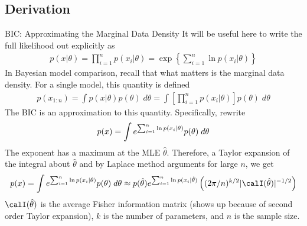 \documentclass[aspectratio=169, handout]{beamer}
\newcommand{\sumin}{\sum^n_{i=1}}
\newcommand{\prodin}{\prod^n_{i=1}}
\begin{document}
\subsection{Derivation}


{\footnotesize
\begin{frame}{BIC: Approximating the Marginal Data Density}
It will be useful here to write the full likelihood out explicitly as
\begin{align*}
  p(x|\theta)
  =
  \prodin p(x_i|\theta)
  =
  \exp\left\{
  \sumin \ln p(x_i|\theta)
  \right\}
\end{align*}
In Bayesian model comparison, recall that what matters is the
\alert{marginal data density}.
For a single model, this quantity is defined
\begin{align*}
  p(x_{1:n})
  = \int p(x|\theta)p(\theta)\;d\theta
  = \int \left[\prodin p(x_i|\theta)\right]p(\theta)\;d\theta
\end{align*}
The BIC is an approximation to this quantity.
Specifically, rewrite
\begin{align*}
  p(x)
  =
  \int
  e^{%
    \sumin \ln p(x_i|\theta)
  }
  p(\theta)\;d\theta
\end{align*}
The exponent has a maximum at the MLE $\hat{\theta}$.
Therefore, a \alert{Taylor expansion} of the integral about
$\hat{\theta}$ and by Laplace method arguments for large $n$, we get
\begin{align*}
  p(x)
  =
  \int
  e^{%
    \sumin \ln p(x_i|\theta)
  }
  p(\theta)\;d\theta
  \approx
  p(\hat{\theta})
  e^{%
    \sumin \ln p(x_i|\hat{\theta})
  }
  \left(
  (2\pi/n)^{k/2} |\calI(\hat{\theta})|^{-1/2}
  \right)
\end{align*}
$\calI(\hat{\theta})$ is the average Fisher information matrix
(shows up because of second order Taylor expansion), $k$ is the
number of parameters, and $n$ is the sample size.
\end{frame}
}
\end{document}
